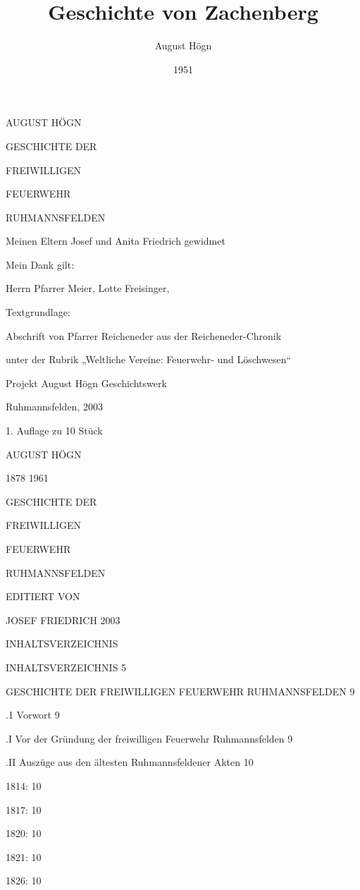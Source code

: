 \documentclass[12pt,a4pager]{book}
\author{August Högn}
\title{Geschichte von Zachenberg}
\date{1951}
\begin{document}
\maketitle

AUGUST HÖGN

GESCHICHTE DER

FREIWILLIGEN

FEUERWEHR

RUHMANNSFELDEN

Meinen Eltern Josef und Anita Friedrich gewidmet

Mein Dank gilt:

Herrn Pfarrer Meier, Lotte Freisinger,

Textgrundlage:

Abschrift von Pfarrer Reicheneder aus der Reicheneder-Chronik

unter der Rubrik „Weltliche Vereine: Feuerwehr- und Löschwesen“

Projekt August Högn Geschichtswerk

Ruhmannsfelden, 2003

1. Auflage zu 10 Stück



AUGUST HÖGN

1878 1961





GESCHICHTE DER

FREIWILLIGEN

FEUERWEHR

RUHMANNSFELDEN






EDITIERT VON

JOSEF FRIEDRICH 2003





INHALTSVERZEICHNIS

INHALTSVERZEICHNIS  5

GESCHICHTE DER FREIWILLIGEN FEUERWEHR RUHMANNSFELDEN    9

.1 Vorwort  9

.I Vor der Gründung der freiwilligen Feuerwehr Ruhmannsfelden   9

.II Auszüge aus den ältesten Ruhmannsfeldener Akten 10

1814:   10

1817:   10

1820:   10

1821:   10

1826:   10
\end{document}
